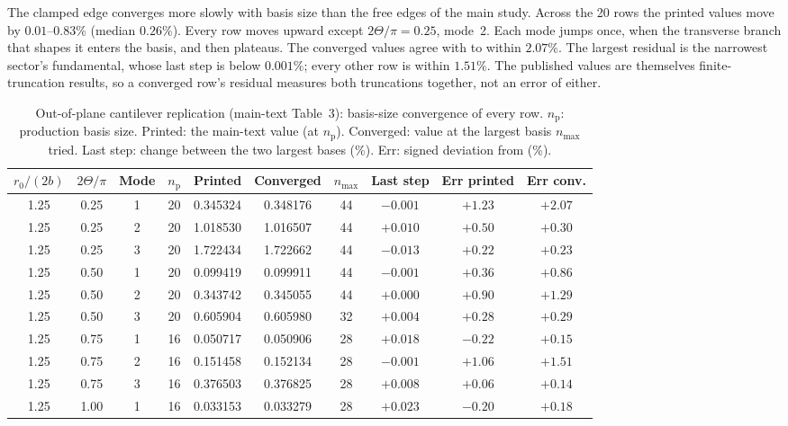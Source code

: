 \documentclass[11pt]{article}
\begin{document}
The clamped edge converges more slowly with basis size than the free
edges of the main study. Across the 20 rows the printed values move by
$0.01$--$0.83\%$ (median $0.26\%$). Every row moves upward except
$2\Theta/\pi=0.25$, mode~2. Each mode jumps once, when the transverse
branch that shapes it enters the basis, and then plateaus. The converged
values agree with \cite{seok1} to within $2.07\%$. The largest residual
is the narrowest sector's fundamental, whose last step is below
$0.001\%$; every other row is within $1.51\%$. The published values are themselves finite-truncation results,
so a converged row's residual measures both truncations together, not an
error of either.

\begin{table}[!htbp]\centering\scriptsize
\setlength{\tabcolsep}{3pt}
\caption{Out-of-plane cantilever replication (main-text Table~3):
basis-size convergence of every row. $n_{\mathrm{p}}$: production basis
size. Printed: the main-text value (at $n_{\mathrm{p}}$). Converged:
value at the largest basis $n_{\max}$ tried. Last step: change between
the two largest bases (\%). Err: signed deviation from \cite{seok1} (\%).}
\label{tab:cantilever-conv}
\begin{tabular}{cccccccccc}
\toprule $r_0/(2b)$ & $2\Theta/\pi$ & Mode & $n_{\mathrm{p}}$ & Printed & Converged & $n_{\max}$ & Last step & Err printed & Err conv.\\ \midrule
1.25 & 0.25 & 1 & 20 & 0.345324 & 0.348176 & 44 & $-0.001$ & $+1.23$ & $+2.07$\\
1.25 & 0.25 & 2 & 20 & 1.018530 & 1.016507 & 44 & $+0.010$ & $+0.50$ & $+0.30$\\
1.25 & 0.25 & 3 & 20 & 1.722434 & 1.722662 & 44 & $-0.013$ & $+0.22$ & $+0.23$\\
1.25 & 0.50 & 1 & 20 & 0.099419 & 0.099911 & 44 & $-0.001$ & $+0.36$ & $+0.86$\\
1.25 & 0.50 & 2 & 20 & 0.343742 & 0.345055 & 44 & $+0.000$ & $+0.90$ & $+1.29$\\
1.25 & 0.50 & 3 & 20 & 0.605904 & 0.605980 & 32 & $+0.004$ & $+0.28$ & $+0.29$\\
1.25 & 0.75 & 1 & 16 & 0.050717 & 0.050906 & 28 & $+0.018$ & $-0.22$ & $+0.15$\\
1.25 & 0.75 & 2 & 16 & 0.151458 & 0.152134 & 28 & $-0.001$ & $+1.06$ & $+1.51$\\
1.25 & 0.75 & 3 & 16 & 0.376503 & 0.376825 & 28 & $+0.008$ & $+0.06$ & $+0.14$\\
1.25 & 1.00 & 1 & 16 & 0.033153 & 0.033279 & 28 & $+0.023$ & $-0.20$ & $+0.18$\\

\end{tabular}
\end{table}
\end{document}
